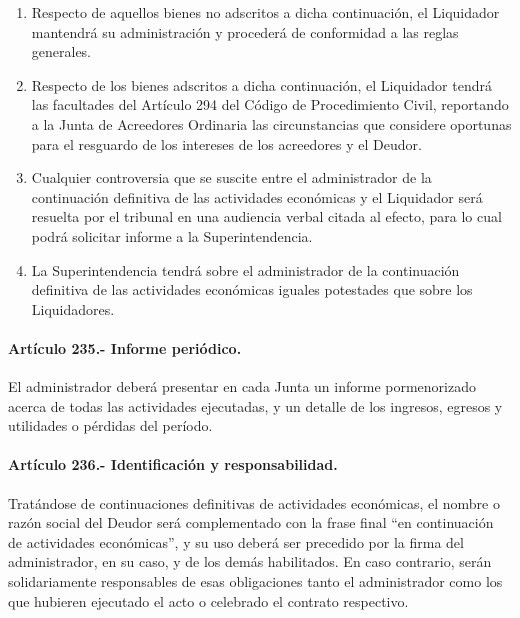 \documentclass[
]{book}
\begin{document}
\begin{enumerate}
\def\labelenumi{\arabic{enumi})}
\item
  Respecto de aquellos bienes no adscritos a dicha continuación, el Liquidador mantendrá su administración y procederá de conformidad a las reglas generales.
\item
  Respecto de los bienes adscritos a dicha continuación, el Liquidador tendrá las facultades del Artículo 294 del Código de Procedimiento Civil, reportando a la Junta de Acreedores Ordinaria las circunstancias que considere oportunas para el resguardo de los intereses de los acreedores y el Deudor.
\item
  Cualquier controversia que se suscite entre el administrador de la continuación definitiva de las actividades económicas y el Liquidador será resuelta por el tribunal en una audiencia verbal citada al efecto, para lo cual podrá solicitar informe a la Superintendencia.
\item
  La Superintendencia tendrá sobre el administrador de la continuación definitiva de las actividades económicas iguales potestades que sobre los Liquidadores.
\end{enumerate}

\hypertarget{artuxedculo-235.--informe-periuxf3dico.}{%
\paragraph*{Artículo 235.- Informe periódico.}\label{artuxedculo-235.--informe-periuxf3dico.}}

El administrador deberá presentar en cada Junta un informe pormenorizado acerca de todas las actividades ejecutadas, y un detalle de los ingresos, egresos y utilidades o pérdidas del período.

\hypertarget{artuxedculo-236.--identificaciuxf3n-y-responsabilidad.}{%
\paragraph*{Artículo 236.- Identificación y responsabilidad.}\label{artuxedculo-236.--identificaciuxf3n-y-responsabilidad.}}

Tratándose de continuaciones definitivas de actividades económicas, el nombre o razón social del Deudor será complementado con la frase final ``en continuación de actividades económicas'', y su uso deberá ser precedido por la firma del administrador, en su caso, y de los demás habilitados. En caso contrario, serán solidariamente responsables de esas obligaciones tanto el administrador como los que hubieren ejecutado el acto o celebrado el contrato respectivo.
\end{document}
